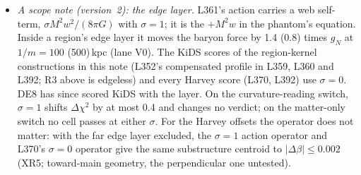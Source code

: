 \documentclass[10pt]{article}
\begin{document}
\begin{itemize}
\item \emph{A scope note (version~2): the edge layer.} L361's action carries a web self-term, $\sigma M^2w^2/(8\pi G)$ with $\sigma=1$; it is the $+M^2w$ in the phantom's equation. Inside a region's edge layer it moves the baryon force by 1.4 (0.8) times $g_N$ at $1/m=100$ (500)\,kpc (lane V0). The KiDS scores of the region-kernel constructions in this note (L352's compensated profile in L359, L360 and L392; R3 above is edgeless) and every Harvey score (L370, L392) use $\sigma=0$. DE8 has since scored KiDS with the layer. On the curvature-reading switch, $\sigma=1$ shifts $\Delta\chi^2$ by at most 0.4 and changes no verdict; on the matter-only switch no cell passes at either $\sigma$. For the Harvey offsets the operator does not matter: with the far edge layer excluded, the $\sigma=1$ action operator and L370's $\sigma=0$ operator give the same substructure centroid to $|\Delta\beta|\leq0.002$ (XR5; toward-main geometry, the perpendicular one untested).
\end{itemize}
\end{document}
